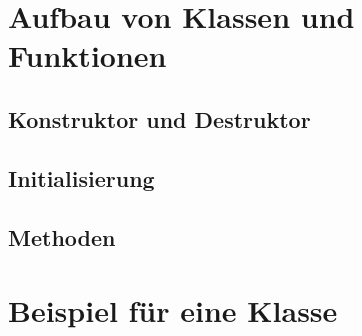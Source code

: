 \chapter{Aufbau von Klassen und Funktionen}
\section{Konstruktor und Destruktor}
\section{Initialisierung}
\section{Methoden}
\chapter{Beispiel für eine Klasse}


